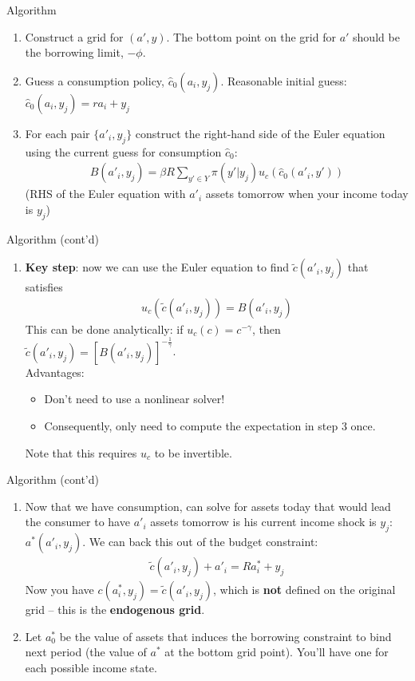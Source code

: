 \documentclass{beamer}
\begin{document}
\begin{frame}{Algorithm}
\begin{enumerate}
\item Construct a grid for $(a', y)$. The bottom point on the grid for $a'$ should be the borrowing limit, $-\phi$.
\item Guess a consumption policy, $\hat{c}_0(a_i, y_j)$. Reasonable initial guess: $\hat{c}_0(a_i, y_j) = r a_i + y_j$
\item For each pair $\{a'_i, y_j\}$ construct the right-hand side of the Euler equation using the current guess for consumption $\hat{c}_0$:
\begin{align*}
B(a'_i, y_j) = \beta R \displaystyle \sum_{y' \in Y} \pi(y'|y_j) u_c(\hat{c}_0(a'_i, y'))
\end{align*}
(RHS of the Euler equation with $a'_i$ assets tomorrow when your income today is $y_j$)
\saveenum
\end{enumerate}
\end{frame}

\begin{frame}{Algorithm (cont'd)}
\begin{enumerate}
\resume
\item \textbf{Key step}: now we can use the Euler equation to find $\tilde{c}(a'_i, y_j)$ that satisfies
\begin{align*}
u_c(\tilde{c}(a'_i, y_j)) = B(a'_i, y_j)
\end{align*}
This can be done analytically: if $u_c(c) = c^{-\gamma}$, then $\tilde{c}(a'_i, y_j) = [B(a'_i, y_j)]^{-\frac{1}{\gamma}}$. \\ \vspace{5mm}
Advantages:
\begin{itemize}
\item Don't need to use a nonlinear solver!
\item Consequently, only need to compute the expectation in step 3 once.
\end{itemize}
Note that this requires $u_c$ to be invertible.
\saveenum
\end{enumerate}
\end{frame}

\begin{frame}{Algorithm (cont'd)}
\begin{enumerate}
\resume
\item Now that we have consumption, can solve for assets today that would lead the consumer to have $a'_i$ assets tomorrow is his current income shock is $y_j$: $a^*(a'_i, y_j)$. We can back this out of the budget constraint:
\begin{align*}
\tilde{c}(a'_i, y_j) + a'_i = R a^*_i + y_j
\end{align*}
Now you have $c(a_i^*, y_j) = \tilde{c}(a'_i, y_j)$, which is \textbf{not} defined on the original grid -- this is the \textbf{endogenous grid}.
\item Let $a_0^*$ be the value of assets that induces the borrowing constraint to bind next period (the value of $a^*$ at the bottom grid point). You'll have one for each possible income state.
\saveenum
\end{enumerate}
\end{frame}
\end{document}
